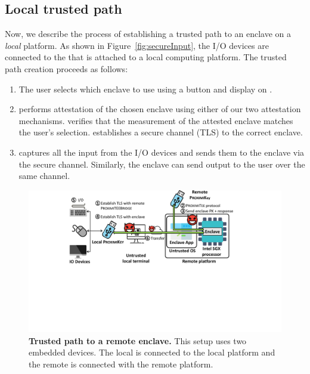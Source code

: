 


\subsection{Local trusted path} 

Now, we describe the process of establishing a trusted path to an enclave on a \emph{local} platform. As shown in Figure~\ref{fig:secureInput}, the I/O devices are connected to the \device that is attached to a local computing platform. The trusted path creation proceeds as follows:

\begin{enumerate}
    \item[\one] The user selects which enclave to use using a button and display on \device.
    \item[\two] \device performs attestation of the chosen enclave using either of our two attestation mechanisms. \device verifies that the measurement of the attested enclave matches the user's selection. \device establishes a secure channel (TLS) to the correct enclave.
    \item[\three] \device captures all the input from the I/O devices and sends them to the enclave via the secure channel. Similarly, the enclave can send output to the user over the same channel.
\end{enumerate}
 

\begin{figure}[t]
 \centering
  \includegraphics[width=0.85\linewidth]{chapters/ProximiTEE/images/SystemDesignRemote.pdf}
 \caption{\textbf{Trusted path to a remote enclave.} This setup uses two embedded devices. The local \device is connected to the local platform and the remote \device is connected with the remote platform.}
 \label{fig:systemRemoteHost}
\end{figure}

